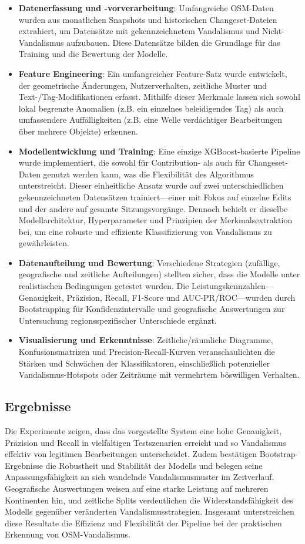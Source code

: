 \documentclass[
    13pt, %
    a4paper, %
    listof=totoc, %
    bibliography=totoc, %
    index=totoc, %
    headsepline
]{scrreprt}
\begin{document}
\begin{itemize}
  \item \textbf{Datenerfassung und -vorverarbeitung}: Umfangreiche OSM-Daten wurden aus monatlichen Snapshots und historischen Changeset-Dateien extrahiert, um Datensätze mit gekennzeichnetem Vandalismus und Nicht-Vandalismus aufzubauen. Diese Datensätze bilden die Grundlage für das Training und die Bewertung der Modelle.
  \item \textbf{Feature Engineering}: Ein umfangreicher Feature-Satz wurde entwickelt, der geometrische Änderungen, Nutzerverhalten, zeitliche Muster und Text-/Tag-Modifikationen erfasst. Mithilfe dieser Merkmale lassen sich sowohl lokal begrenzte Anomalien (z.B. ein einzelnes beleidigendes Tag) als auch umfassendere Auffälligkeiten (z.B. eine Welle verdächtiger Bearbeitungen über mehrere Objekte) erkennen.
  \item \textbf{Modellentwicklung und Training}: Eine einzige XGBoost-basierte Pipeline wurde implementiert, die sowohl für Contribution- als auch für Changeset-Daten genutzt werden kann, was die Flexibilität des Algorithmus unterstreicht. Dieser einheitliche Ansatz wurde auf zwei unterschiedlichen gekennzeichneten Datensätzen trainiert—einer mit Fokus auf einzelne Edits und der andere auf gesamte Sitzungsvorgänge. Dennoch behielt er dieselbe Modellarchitektur, Hyperparameter und Prinzipien der Merkmalsextraktion bei, um eine robuste und effiziente Klassifizierung von Vandalismus zu gewährleisten.
  \item \textbf{Datenaufteilung und Bewertung}: Verschiedene Strategien (zufällige, geografische und zeitliche Aufteilungen) stellten sicher, dass die Modelle unter realistischen Bedingungen getestet wurden. Die Leistungskennzahlen—Genauigkeit, Präzision, Recall, F1-Score und AUC-PR/ROC—wurden durch Bootstrapping für Konfidenzintervalle und geografische Auswertungen zur Untersuchung regionsspezifischer Unterschiede ergänzt.
  \item \textbf{Visualisierung und Erkenntnisse}: Zeitliche/räumliche Diagramme, Konfusionsmatrizen und Precision-Recall-Kurven veranschaulichten die Stärken und Schwächen der Klassifikatoren, einschließlich potenzieller Vandalismus-Hotspots oder Zeiträume mit vermehrtem böswilligen Verhalten.
\end{itemize}

\subsection*{Ergebnisse}
\noindent
Die Experimente zeigen, dass das vorgestellte System eine hohe Genauigkeit, Präzision und Recall in vielfältigen Testszenarien erreicht und so Vandalismus effektiv von legitimen Bearbeitungen unterscheidet. Zudem bestätigen Bootstrap-Ergebnisse die Robustheit und Stabilität des Modells und belegen seine Anpassungsfähigkeit an sich wandelnde Vandalismusmuster im Zeitverlauf. Geografische Auswertungen weisen auf eine starke Leistung auf mehreren Kontinenten hin, und zeitliche Splits verdeutlichen die Widerstandsfähigkeit des Modells gegenüber veränderten Vandalismusstrategien. Insgesamt unterstreichen diese Resultate die Effizienz und Flexibilität der Pipeline bei der praktischen Erkennung von OSM-Vandalismus.
\end{document}
